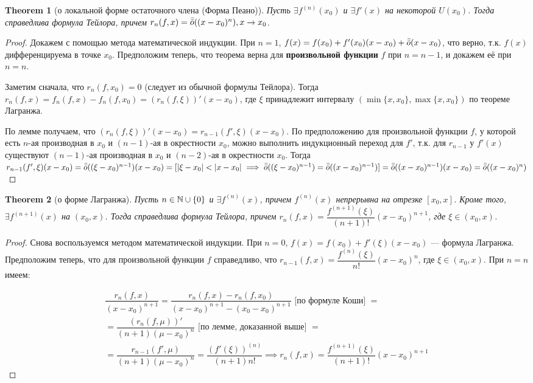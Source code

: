 \documentclass[a4paper]{article}
\theoremstyle{named}
\newtheorem*{namedtheorem}{Theorem}
\begin{document}
\begin{colloq}
		\begin{namedtheorem}[о локальной форме остаточного члена (Форма Пеано)]
			Пусть $\exists f^{(n)}(x_0)$ и $\exists f'(x)$ на некоторой $U(x_0)$. Тогда справедлива формула Тейлора, причем $r_n(f, x) = \bar{\bar{o}}((x - x_0)^n), x \to x_0$.
		\end{namedtheorem}

		\begin{proof}
			Докажем с помощью метода математической индукции. При $n = 1$, $f(x) = f(x_0) + f'(x_0)(x - x_0) + \bar{\bar{o}}(x - x_0)$, что верно, т.к. $f(x)$ дифференцируема в точке $x_0$. Предположим теперь, что теорема верна для \textbf{произвольной функции} $f$ при $n = n - 1$, и докажем её при $n = n$.

			Заметим сначала, что $r_n(f, x_0) = 0$ (следует из обычной формулы Тейлора). Тогда $r_n(f, x) = f_n(f, x) - f_n(f, x_0) = (r_n(f, \xi))'(x - x_0)$, где $\xi$ принадлежит интервалу $(\min\{x, x_0\}, \max\{x, x_0\})$ по теореме Лагранжа.

			По лемме получаем, что $(r_n(f, \xi))'(x - x_0) = r_{n - 1}(f', \xi)(x - x_0)$. По предположению для произвольной функции $f$, у которой есть $n$-ая производная в $x_0$ и $(n - 1)$-ая в окрестности $x_0$, можно выполнить индукционный переход для $f'$, т.к. для $r_{n - 1}$ у $f'(x)$ существуют $(n - 1)$-ая производная в $x_0$ и $(n - 2)$-ая в окрестности $x_0$. Тогда $r_{n - 1}(f', \xi)(x - x_0) = \bar{\bar{o}}((\xi - x_0)^{n - 1})(x - x_0) = [|\xi - x_0| < |x - x_0| \implies \bar{\bar{o}}((\xi - x_0)^{n - 1}) = \bar{\bar{o}}((x - x_0)^{n - 1})] = \bar{\bar{o}}((x - x_0)^{n - 1})(x - x_0) = \bar{\bar{o}}((x - x_0)^n)$
		\end{proof}

		\begin{namedtheorem}[о форме Лагранжа]
			Пусть $n \in \mathbb{N} \cup \{0\}$ и $\exists f^{(n)}(x)$, причем $f^{(n)}(x)$ непрерывна на отрезке $[x_0, x]$. Кроме того, $\exists f^{(n + 1)}(x)$ на $(x_0, x)$. Тогда справедлива формула Тейлора, причем $r_n(f, x) = \dfrac{f^{(n + 1)}(\xi)}{(n + 1)!}(x - x_0)^{n + 1}$, где $\xi \in (x_0, x)$.
		\end{namedtheorem}

		\begin{proof}
			Снова воспользуемся методом математической индукции. При $n = 0$, $f(x) = f(x_0) + f'(\xi)(x - x_0)$ --- формула Лагранжа. Предположим теперь, что для произвольной функции $f$ справедливо, что $r_{n - 1}(f, x) = \dfrac{f^{(n)}(\xi)}{n!}(x - x_0)^n$, где $\xi \in (x_0, x)$. При $n = n$ имеем:

			\[\begin{gathered}
				\dfrac{r_n(f, x)}{(x - x_0)^{n + 1}} = \dfrac{r_n(f, x) - r_n(f, x_0)}{(x - x_0)^{n + 1} - (x_0 - x_0)^{n + 1}} \text{ [по формуле Коши] } = \\
				= \dfrac{(r_n(f, \mu))'}{(n + 1)(\mu - x_0)^n} \text{ [по лемме, доказанной выше] } = \\
				= \dfrac{r_{n - 1}(f', \mu)}{(n + 1)(\mu - x_0)^n} = \dfrac{(f'(\xi))^{(n)}}{(n + 1)n!} \implies r_n(f, x) = \dfrac{f^{(n + 1)}(\xi)}{(n + 1)!}(x - x_0)^{n + 1}
			\end{gathered}\]
		\end{proof}


\end{colloq}
\end{document}
